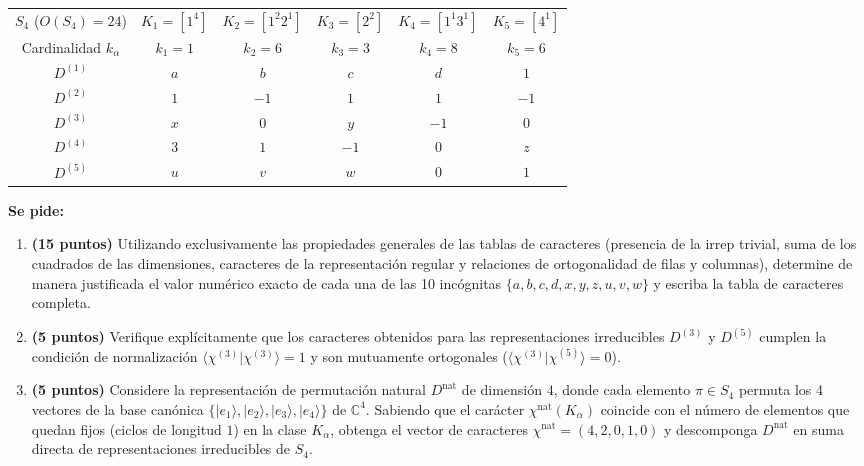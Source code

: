 \documentclass[11pt, a4paper]{article}
\begin{document}
\vspace{2mm}
\begin{center}
\renewcommand{\arraystretch}{1.35}
\begin{tabular}{c|ccccc}
\toprule
$S_4$ ($O(S_4)=24$) & $K_1 = [1^4]$ & $K_2 = [1^2 2^1]$ & $K_3 = [2^2]$ & $K_4 = [1^1 3^1]$ & $K_5 = [4^1]$ \\
Cardinalidad $k_\alpha$ & $k_1 = 1$ & $k_2 = 6$ & $k_3 = 3$ & $k_4 = 8$ & $k_5 = 6$ \\
\midrule
$D^{(1)}$ & $a$ & $b$ & $c$ & $d$ & $1$ \\
$D^{(2)}$ & $1$ & $-1$ & $1$ & $1$ & $-1$ \\
$D^{(3)}$ & $x$ & $0$ & $y$ & $-1$ & $0$ \\
$D^{(4)}$ & $3$ & $1$ & $-1$ & $0$ & $z$ \\
$D^{(5)}$ & $u$ & $v$ & $w$ & $0$ & $1$ \\
\bottomrule
\end{tabular}
\end{center}
\vspace{2mm}

\noindent \textbf{Se pide:}
\begin{enumerate}[label=\textbf{\alph*)}]
    \item \textbf{(15 puntos)} Utilizando exclusivamente las propiedades generales de las tablas de caracteres (presencia de la irrep trivial, suma de los cuadrados de las dimensiones, caracteres de la representación regular y relaciones de ortogonalidad de filas y columnas), determine de manera justificada el valor numérico exacto de cada una de las 10 incógnitas $\{a, b, c, d, x, y, z, u, v, w\}$ y escriba la tabla de caracteres completa.
    \item \textbf{(5 puntos)} Verifique explícitamente que los caracteres obtenidos para las representaciones irreducibles $D^{(3)}$ y $D^{(5)}$ cumplen la condición de normalización $\langle \chi^{(3)} | \chi^{(3)} \rangle = 1$ y son mutuamente ortogonales ($\langle \chi^{(3)} | \chi^{(5)} \rangle = 0$).
    \item \textbf{(5 puntos)} Considere la representación de permutación natural $D^{\text{nat}}$ de dimensión $4$, donde cada elemento $\pi \in S_4$ permuta los 4 vectores de la base canónica $\{|e_1\rangle, |e_2\rangle, |e_3\rangle, |e_4\rangle\}$ de $\mathbb{C}^4$. Sabiendo que el carácter $\chi^{\text{nat}}(K_\alpha)$ coincide con el número de elementos que quedan fijos (ciclos de longitud $1$) en la clase $K_\alpha$, obtenga el vector de caracteres $\chi^{\text{nat}} = (4, 2, 0, 1, 0)$ y descomponga $D^{\text{nat}}$ en suma directa de representaciones irreducibles de $S_4$.
\end{enumerate}
\end{document}
